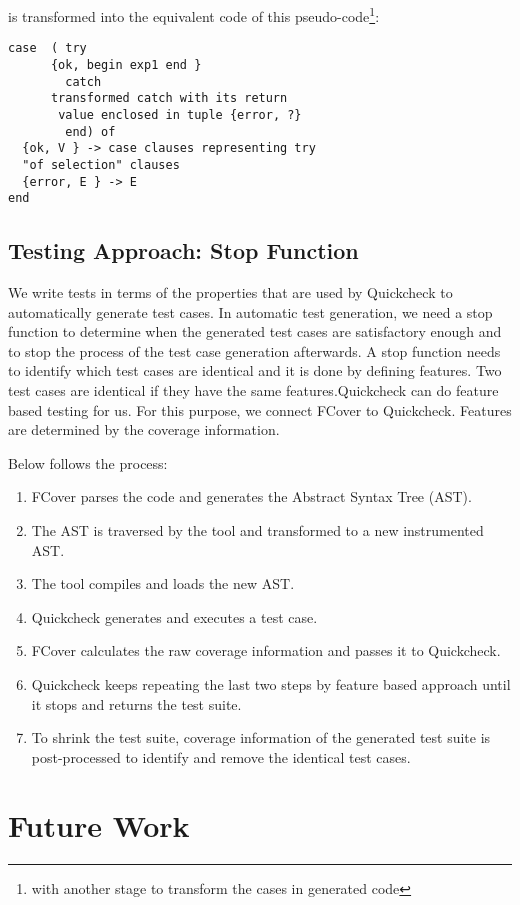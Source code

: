 \documentclass[12pt,a4paper]{report}
\begin{document}
is transformed into the equivalent code of this pseudo-code\footnote{with another stage to transform the cases in generated code}:

\begin{lstlisting}
case  ( try
	  {ok, begin exp1 end }
        catch        
	  transformed catch with its return
	   value enclosed in tuple {error, ?}
        end) of
  {ok, V } -> case clauses representing try
  "of selection" clauses
  {error, E } -> E
end
\end{lstlisting}

\section{Testing Approach: Stop Function}
We write tests in terms of the properties that are used by Quickcheck\cite{claessen2000quickcheck} to automatically generate test cases. In automatic test generation, we need a stop function to determine when the generated test cases are satisfactory enough and to stop the process of the test case generation afterwards. A stop function needs to identify which test cases are identical and it is done by defining features. Two test cases are identical if they have the same features.Quickcheck can do feature based testing for us. For this purpose, we connect FCover to Quickcheck. Features are determined by the coverage information.

Below follows the process:
\begin{enumerate}
 \item FCover parses the code and generates the Abstract Syntax Tree (AST).
 \item The AST is traversed by the tool and transformed to a new instrumented AST.
 \item The tool compiles and loads the new AST.
 \item Quickcheck generates and executes a test case.
 \item FCover calculates the raw coverage information and passes it to Quickcheck.
 \item Quickcheck keeps repeating the last two steps by feature based approach until it stops and returns the test suite.  
 \item To shrink the test suite, coverage information of the generated test suite is post-processed to identify and remove the identical test cases.
\end{enumerate}
\newpage
\chapter{Future Work}
\newpage
{}


\end{document}
